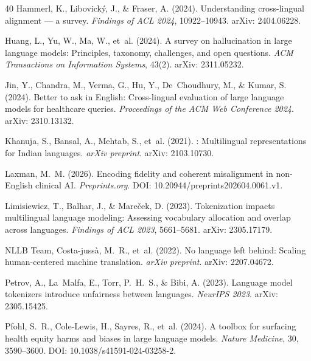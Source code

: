 \documentclass[11pt,a4paper]{article}
\begin{document}
\begin{thebibliography}{40}
Hammerl, K., Libovick\'{y}, J., \& Fraser, A. (2024).
\newblock Understanding cross-lingual alignment --- a survey.
\newblock \emph{Findings of ACL 2024}, 10922--10943.
\newblock arXiv: 2404.06228.

Huang, L., Yu, W., Ma, W., et~al. (2024).
\newblock A survey on hallucination in large language models: Principles, taxonomy,
challenges, and open questions.
\newblock \emph{ACM Transactions on Information Systems}, 43(2).
\newblock arXiv: 2311.05232.

Jin, Y., Chandra, M., Verma, G., Hu, Y., De~Choudhury, M., \& Kumar, S. (2024).
\newblock Better to ask in {English}: Cross-lingual evaluation of large language models
for healthcare queries.
\newblock \emph{Proceedings of the ACM Web Conference 2024}.
\newblock arXiv: 2310.13132.

Khanuja, S., Bansal, A., Mehtab, S., et~al. (2021).
: Multilingual representations for {Indian} languages.
\newblock \emph{arXiv preprint}.
\newblock arXiv: 2103.10730.

Laxman, M.~M. (2026).
\newblock Encoding fidelity and coherent misalignment in non-{E}nglish clinical {AI}.
\newblock \emph{Preprints.org}.
\newblock DOI: 10.20944/preprints202604.0061.v1.

Limisiewicz, T., Balhar, J., \& Mare\v{c}ek, D. (2023).
\newblock Tokenization impacts multilingual language modeling: Assessing vocabulary
allocation and overlap across languages.
\newblock \emph{Findings of ACL 2023}, 5661--5681.
\newblock arXiv: 2305.17179.

{NLLB Team}, Costa-juss\`{a}, M.~R., et~al. (2022).
\newblock No language left behind: Scaling human-centered machine translation.
\newblock \emph{arXiv preprint}.
\newblock arXiv: 2207.04672.

Petrov, A., La~Malfa, E., Torr, P.~H.~S., \& Bibi, A. (2023).
\newblock Language model tokenizers introduce unfairness between languages.
\newblock \emph{NeurIPS 2023}.
\newblock arXiv: 2305.15425.

Pfohl, S.~R., Cole-Lewis, H., Sayres, R., et~al. (2024).
\newblock A toolbox for surfacing health equity harms and biases in large language models.
\newblock \emph{Nature Medicine}, 30, 3590--3600.
\newblock DOI: 10.1038/s41591-024-03258-2.


\end{thebibliography}
\end{document}
